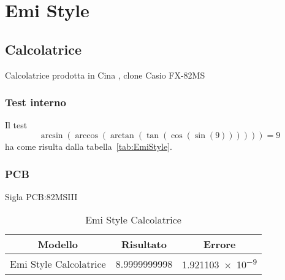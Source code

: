 \chapter{Emi Style}
\section{Calcolatrice}
Calcolatrice prodotta in Cina  , clone  Casio FX-82MS
\subsection{Test interno}
Il test\[\arcsin(\arccos(\arctan(\tan(\cos(\sin(9))))))=9\] ha come risulta dalla tabella~\vref{tab:EmiStyle}. 
\subsection{PCB}
Sigla PCB:82MSIII
\begin{table}
	\centering
	\begin{tabular}{lll}
		\toprule
		\multicolumn{1}{c}{Modello}&\multicolumn{1}{c}{Risultato}&\multicolumn{1}{c}{Errore}\\
		\midrule
		Emi Style Calcolatrice&\num{8.9999999998}&\num{1.921103e-9}\\
		\bottomrule
	\end{tabular} 
	\caption{Emi Style Calcolatrice}
	\label{tab:EmiStyle}
\end{table}